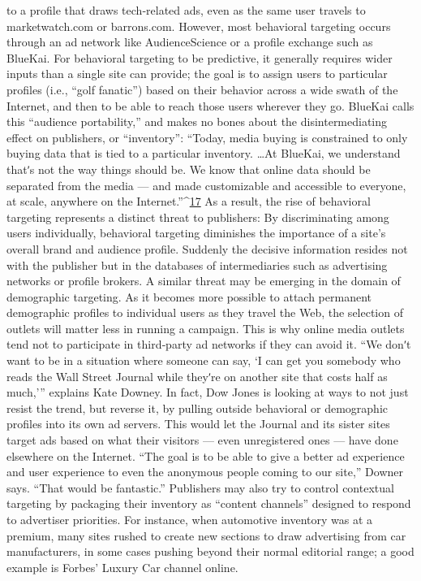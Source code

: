 to a profile that draws tech‐related ads, even as the same user travels to
marketwatch.com or barrons.com.
However, most behavioral targeting occurs through an ad network like
AudienceScience or a profile exchange such as BlueKai. For behavioral
targeting to be predictive, it generally requires wider inputs than a single
site can provide; the goal is to assign users to particular profiles (i.e., ``golf
fanatic'') based on their behavior across a wide swath of the Internet, and
then to be able to reach those users wherever they go. BlueKai calls this
``audience portability,'' and makes no bones about the disintermediating
effect on publishers, or ``inventory'':
``Today, media buying is constrained to only buying data that is
tied to a particular inventory. \ldots  At BlueKai, we understand thatʹs
not the way things should be. We know that online data should be
separated from the media — and made customizable and accessible
to everyone, at scale, anywhere on the Internet.''^{\href{#endnotes}{17}}
As a result, the rise of behavioral targeting represents a distinct threat to
publishers: By discriminating among users individually, behavioral
targeting diminishes the importance of a site’s overall brand and audience
profile. Suddenly the decisive information resides not with the publisher
but in the databases of intermediaries such as advertising networks or
profile brokers. A similar threat may be emerging in the domain of
demographic targeting. As it becomes more possible to attach permanent
demographic profiles to individual users as they travel the Web, the
selection of outlets will matter less in running a campaign.
This is why online media outlets tend not to participate in third‐party ad
networks if they can avoid it. ``We donʹt want to be in a situation where
someone can say, ‘I can get you somebody who reads the Wall Street
Journal while theyʹre on another site that costs half as much,’'' explains
Kate Downey.
In fact, Dow Jones is looking at ways to not just resist the trend, but
reverse it, by pulling outside behavioral or demographic profiles into its
own ad servers. This would let the Journal and its sister sites target ads
based on what their visitors — even unregistered ones — have done
elsewhere on the Internet. ``The goal is to be able to give a better ad
experience and user experience to even the anonymous people coming to
our site,'' Downer says. ``That would be fantastic.''
Publishers may also try to control contextual targeting by packaging their
inventory as ``content channels'' designed to respond to advertiser
priorities. For instance, when automotive inventory was at a premium,
many sites rushed to create new sections to draw advertising from car
manufacturers, in some cases pushing beyond their normal editorial
range; a good example is Forbes’ Luxury Car channel online.
